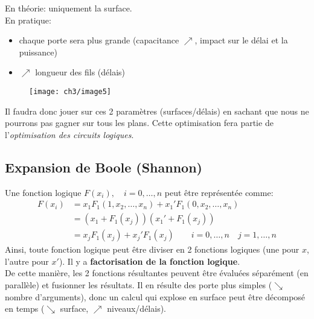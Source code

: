 En théorie: uniquement la surface.\\
En pratique:
\begin{itemize}
	\item chaque porte sera plus grande (capacitance $\nearrow$, impact sur le délai et la puissance)
	\item $\nearrow$ longueur des fils (délais)
\end{itemize}
\begin{figure}[H]
	\centering
	\texttt{[image: ch3/image5]}
\end{figure}
Il faudra donc jouer sur ces 2 paramètres (surfaces/délais) en sachant que nous ne pourrons pas gagner sur tous les plans. Cette optimisation fera partie de l'\textit{optimisation des circuits logiques}.
\subsection{Expansion de Boole (Shannon)}
Une fonction logique $F(x_i),\quad i=0,\dots,n$ peut être représentée comme:
\begin{align}
	F(x_i) &= x_1F_1(1,x_2,\dots,x_n)+x_1'F_1(0,x_2,\dots,x_n)\\
	&= (x_1+F_1(x_j))(x_1'+F_1(x_j))\\
	&= x_jF_1(x_j)+x_j'F_1(x_j)\qquad i=0,\dots,n\quad j=1,\dots,n
\end{align}
Ainsi, toute fonction logique peut être diviser en 2 fonctions logiques (une pour $x$, l'autre pour $x'$). Il y a \textbf{factorisation de la fonction logique}.\\

De cette manière, les 2 fonctions résultantes peuvent être évaluées séparément (en parallèle) et fusionner les résultats. Il en résulte des porte plus simples ($\searrow$ nombre d'arguments), donc un calcul qui explose en surface peut être décomposé en temps ($\searrow$ surface, $\nearrow$ niveaux/délais).